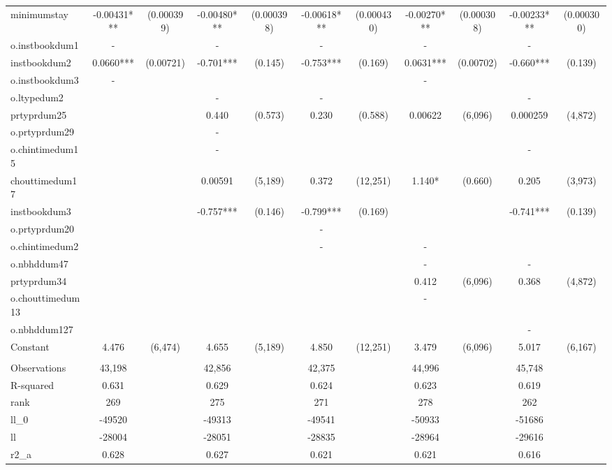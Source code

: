 \documentclass[]{article}
\begin{document}
\begin{tabular}{lcccccccccc}
minimumstay & -0.00431*** & (0.000399) & -0.00480*** & (0.000398) & -0.00618*** & (0.000430) & -0.00270*** & (0.000308) & -0.00233*** & (0.000300) \\
o.instbookdum1 & - &  & - &  & - &  & - &  & - &  \\
instbookdum2 & 0.0660*** & (0.00721) & -0.701*** & (0.145) & -0.753*** & (0.169) & 0.0631*** & (0.00702) & -0.660*** & (0.139) \\
o.instbookdum3 & - &  &  &  &  &  & - &  &  &  \\
o.ltypedum2 &  &  & - &  & - &  &  &  & - &  \\
prtyprdum25 &  &  & 0.440 & (0.573) & 0.230 & (0.588) & 0.00622 & (6,096) & 0.000259 & (4,872) \\
o.prtyprdum29 &  &  & - &  &  &  &  &  &  &  \\
o.chintimedum15 &  &  & - &  &  &  &  &  & - &  \\
chouttimedum17 &  &  & 0.00591 & (5,189) & 0.372 & (12,251) & 1.140* & (0.660) & 0.205 & (3,973) \\
instbookdum3 &  &  & -0.757*** & (0.146) & -0.799*** & (0.169) &  &  & -0.741*** & (0.139) \\
o.prtyprdum20 &  &  &  &  & - &  &  &  &  &  \\
o.chintimedum2 &  &  &  &  & - &  & - &  &  &  \\
o.nbhddum47 &  &  &  &  &  &  & - &  & - &  \\
prtyprdum34 &  &  &  &  &  &  & 0.412 & (6,096) & 0.368 & (4,872) \\
o.chouttimedum13 &  &  &  &  &  &  & - &  &  &  \\
o.nbhddum127 &  &  &  &  &  &  &  &  & - &  \\
Constant & 4.476 & (6,474) & 4.655 & (5,189) & 4.850 & (12,251) & 3.479 & (6,096) & 5.017 & (6,167) \\
 &  &  &  &  &  &  &  &  &  &  \\
Observations & 43,198 &  & 42,856 &  & 42,375 &  & 44,996 &  & 45,748 &  \\
R-squared & 0.631 &  & 0.629 &  & 0.624 &  & 0.623 &  & 0.619 &  \\
rank & 269 &  & 275 &  & 271 &  & 278 &  & 262 &  \\
ll\_0 & -49520 &  & -49313 &  & -49541 &  & -50933 &  & -51686 &  \\
ll & -28004 &  & -28051 &  & -28835 &  & -28964 &  & -29616 &  \\
r2\_a & 0.628 &  & 0.627 &  & 0.621 &  & 0.621 &  & 0.616 &  \\

\end{tabular}
\end{document}
